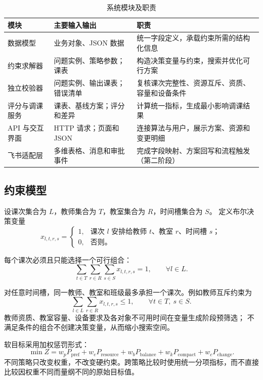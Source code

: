 \begin{table}[htbp]
  \centering
  \caption{系统模块及职责}
  \label{tab:modules-new}
  \small
  \begin{tabularx}{\textwidth}{L{2.6cm} L{3.1cm} Y}
    \toprule
    \textbf{模块} & \textbf{主要输入输出} & \textbf{职责} \\
    \midrule
    数据模型 & 业务对象、JSON 数据 & 统一字段定义，承载约束所需的结构化信息 \\
    约束求解器 & 问题实例、策略参数；课表 & 构造决策变量与约束，搜索并优化可行方案 \\
    独立校验器 & 问题实例、输出课表；错误清单 & 复核课次完整性、资源互斥、资质、容量和设备条件 \\
    评分与调课服务 & 课表、基线方案；评分和差异 & 计算统一指标，生成最小影响调课结果 \\
    API 与交互界面 & HTTP 请求；页面和 JSON & 连接算法与用户，展示方案、资源和变更明细 \\
    飞书适配层 & 多维表格、消息和审批事件 & 完成字段映射、方案回写和流程触发（第二阶段） \\
    \bottomrule
  \end{tabularx}
\end{table}

\subsection{约束模型}

设课次集合为 $L$，教师集合为 $T$，教室集合为 $R$，时间槽集合为 $S$。
定义布尔决策变量
\[
  x_{l,t,r,s}=\begin{cases}
  1, & \text{课次 $l$ 安排给教师 $t$、教室 $r$、时间槽 $s$；}\\
  0, & \text{否则。}
  \end{cases}
\]

每个课次必须且只能选择一个可行组合：
\[
  \sum_{t\in T}\sum_{r\in R}\sum_{s\in S}x_{l,t,r,s}=1,
  \qquad \forall l\in L.
\]

对任意时间槽，同一教师、教室和班级最多承担一个课次。例如教师互斥约束为
\[
  \sum_{l\in L}\sum_{r\in R}x_{l,t,r,s}\leq 1,
  \qquad \forall t\in T,\ s\in S.
\]
教师资质、教室容量、设备要求及各对象不可用时间在变量生成阶段预筛选；
不满足条件的组合不创建决策变量，从而缩小搜索空间。

软目标采用加权惩罚形式：
\[
  \min Z = w_p P_{\mathrm{pref}} + w_e P_{\mathrm{resource}}
  + w_b P_{\mathrm{balance}} + w_k P_{\mathrm{compact}}
  + w_c P_{\mathrm{change}}.
\]
不同策略只改变权重，不改变硬约束。跨策略比较时使用统一分项指标，而不直接
比较因权重不同而量纲不同的原始目标值。

